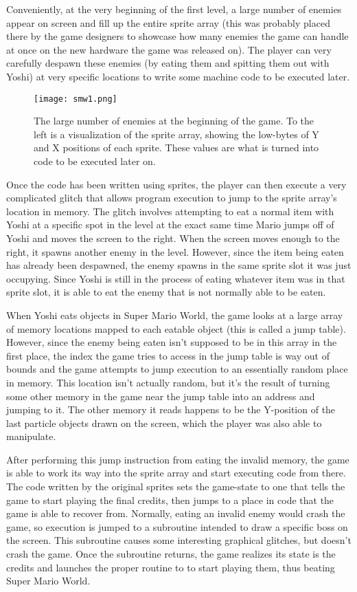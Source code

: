 Conveniently, at the very beginning of the first level, a large number of enemies appear on screen and fill up the entire sprite array (this was probably placed there by the game designers to showcase how many enemies the game can handle at once on the new hardware the game was released on). The player can very carefully despawn these enemies (by eating them and spitting them out with Yoshi) at very specific locations to write some machine code to be executed later.

\begin{figure}
\texttt{[image: smw1.png]}
\caption{The large number of enemies at the beginning of the game. To the left is a visualization of the sprite array, showing the low-bytes of Y and X positions of each sprite. These values are what is turned into code to be executed later on.}
\end{figure}

Once the code has been written using sprites, the player can then execute a very complicated glitch that allows program execution to jump to the sprite array’s location in memory. The glitch involves attempting to eat a normal item with Yoshi at a specific spot in the level at the exact same time Mario jumps off of Yoshi and moves the screen to the right. When the screen moves enough to the right, it spawns another enemy in the level. However, since the item being eaten has already been despawned, the enemy spawns in the same sprite slot it was just occupying. Since Yoshi is still in the process of eating whatever item was in that sprite slot, it is able to eat the enemy that is not normally able to be eaten.

When Yoshi eats objects in Super Mario World, the game looks at a large array of memory locations mapped to each eatable object (this is called a jump table). However, since the enemy being eaten isn’t supposed to be in this array in the first place, the index the game tries to access in the jump table is way out of bounds and the game attempts to jump execution to an essentially random place in memory. This location isn’t actually random, but it’s the result of turning some other memory in the game near the jump table into an address and jumping to it. The other memory it reads happens to be the Y-position of the last particle objects drawn on the screen, which the player was also able to manipulate.

After performing this jump instruction from eating the invalid memory, the game is able to work its way into the sprite array and start executing code from there. The code written by the original sprites sets the game-state to one that tells the game to start playing the final credits, then jumps to a place in code that the game is able to recover from. Normally, eating an invalid enemy would crash the game, so execution is jumped to a subroutine intended to draw a specific boss on the screen. This subroutine causes some interesting graphical glitches, but doesn’t crash the game. Once the subroutine returns, the game realizes its state is the credits and launches the proper routine to to start playing them, thus beating Super Mario World.

